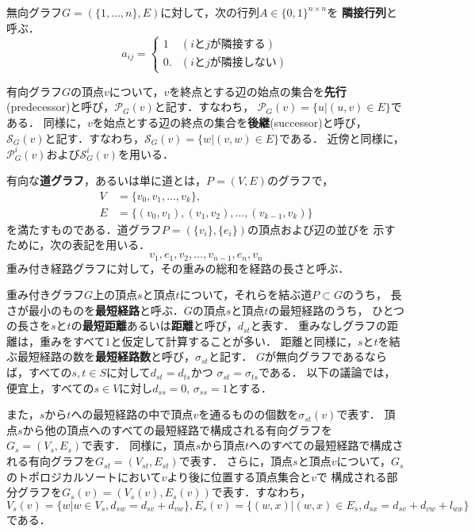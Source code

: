 無向グラフ$G=(\{1,\ldots,n\},E)$に対して，次の行列$A\in\{0,1\}^{n\times n}$を
\textbf{隣接行列}と呼ぶ．
\begin{equation*}
  a_{ij}=
  \begin{cases}
    1 & (i\text{と}j\text{が隣接する}) \\
    0. & (i\text{と}j\text{が隣接しない})
  \end{cases}
\end{equation*}

有向グラフ$G$の頂点$v$について，$v$を終点とする辺の始点の集合を\textbf{先行}
(predecessor)と呼び，$\mathcal{P}_G(v)$と記す．すなわち，
$\mathcal{P}_G(v)=\{u|(u,v)\in E\}$である．
同様に，$v$を始点とする辺の終点の集合を\textbf{後継}(successor)と呼び，
$\mathcal{S}_G(v)$と記す．すなわち，$\mathcal{S}_G(v)=\{w|(v,w)\in E\}$である．
近傍と同様に，$\mathcal{P}_G^i(v)$および$\mathcal{S}_G^i(v)$を用いる．

有向な\textbf{道グラフ}，あるいは単に道とは，$P=(V,E)$のグラフで，
\begin{equation*}
  \begin{aligned}
  V&=\{v_0,v_1,\ldots,v_k\}, \\
  E&=\{(v_0,v_1),(v_1,v_2),\ldots,(v_{k-1},v_k)\}
  \end{aligned}
\end{equation*}
を満たすものである．道グラフ$P=(\{v_i\},\{e_i\})$の頂点および辺の並びを
示すために，次の表記を用いる．
\[ v_1,e_1,v_2,\ldots,v_{n-1},e_n,v_n \]
重み付き経路グラフに対して，その重みの総和を経路の長さと呼ぶ．

重み付きグラフ$G$上の頂点$s$と頂点$t$について，それらを結ぶ道$P\subset G$のうち，
長さが最小のものを\textbf{最短経路}と呼ぶ．$G$の頂点$s$と頂点$t$の最短経路のうち，
ひとつの長さを$s$と$t$の\textbf{最短距離}あるいは\textbf{距離}と呼び，$d_{st}$と表す．
重みなしグラフの距離は，重みをすべて$1$と仮定して計算することが多い．
距離と同様に，$s$と$t$を結ぶ最短経路の数を\textbf{最短経路数}と呼び，$\sigma_{st}$と記す．
$G$が無向グラフであるならば，すべての$s,t\in S$に対して$d_{st}=d_{ts}$かつ
$\sigma_{st}=\sigma_{ts}$である．
以下の議論では，便宜上，すべての$s\in V$に対し$d_{ss}=0$, $\sigma_{ss}=1$とする．

また，$s$から$t$への最短経路の中で頂点$v$を通るものの個数を$\sigma_{st}(v)$で表す．
頂点$s$から他の頂点へのすべての最短経路で構成される有向グラフを$G_s=(V_s,E_s)$で表す．
同様に，頂点$s$から頂点$t$へのすべての最短経路で構成される有向グラフを$G_{st}=(V_{st},E_{st})$で表す．
さらに，頂点$s$と頂点$v$について，$G_s$のトポロジカルソートにおいて$v$より後に位置する頂点集合と$v$で
構成される部分グラフを$G_s(v)=(V_s(v),E_s(v))$で表す．すなわち，
$V_s(v)=\{w|w\in V_s,d_{sw}=d_{sv}+d_{vw}\}, E_s(v)=\{(w,x)|(w,x)\in E_s,d_{sx}=d_{sv}+d_{vw}+l_{wx}\}$
である．

